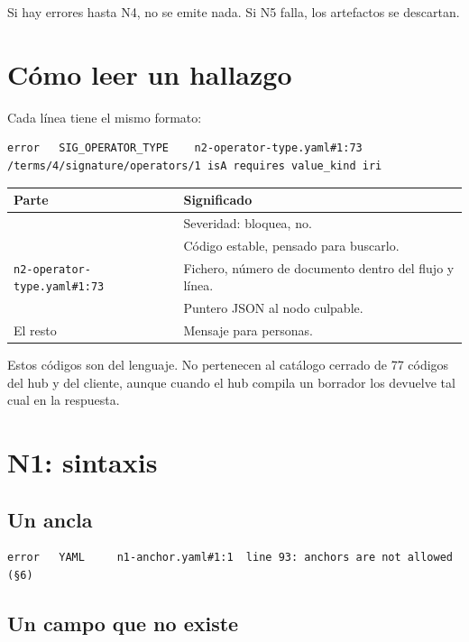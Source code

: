 \medskip
Si hay errores hasta N4, no se emite nada. Si N5 falla, los artefactos se descartan.

\section{Cómo leer un hallazgo}

Cada línea tiene el mismo formato:

\begin{lstlisting}[style=out]
error   SIG_OPERATOR_TYPE    n2-operator-type.yaml#1:73 /terms/4/signature/operators/1 isA requires value_kind iri
\end{lstlisting}

\noindent\begin{tabularx}{\linewidth}{@{}L{6.4cm}Y@{}}
\toprule
\textbf{Parte} & \textbf{Significado} \\
\midrule
{} & Severidad:  bloquea,  no. \\
 & Código estable, pensado para buscarlo. \\
\texttt{n2-operator-type.yaml\#1:73} & Fichero, número de documento dentro del flujo y línea. \\
 & Puntero JSON al nodo culpable. \\
El resto & Mensaje para personas. \\
\bottomrule
\end{tabularx}

\medskip
Estos códigos son del lenguaje. No pertenecen al catálogo cerrado de 77 códigos del hub y del cliente, aunque
cuando el hub compila un borrador los devuelve tal cual en la respuesta.

\section{N1: sintaxis}

\subsection{Un ancla}

\begin{lstlisting}[style=out]
error   YAML     n1-anchor.yaml#1:1  line 93: anchors are not allowed (§6)
\end{lstlisting}

\subsection{Un campo que no existe}

